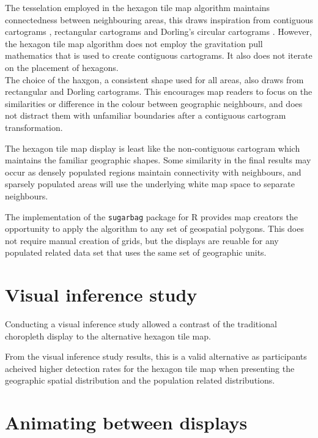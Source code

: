 \documentclass{monashthesis}
\begin{document}
The tesselation employed in the hexagon tile map algorithm maintains connectedness between neighbouring areas, this draws inspiration from contiguous cartograms \autocite{ACA}, rectangular cartograms \autocite{RSCW} and Dorling's circular cartograms \autocite{ACTUC}. However, the hexagon tile map algorithm does not employ the gravitation pull mathematics that is used to create contiguous cartograms. It also does not iterate on the placement of hexagons.\\
The choice of the haxgon, a consistent shape used for all areas, also draws from rectangular and Dorling cartograms. This encourages map readers to focus on the similarities or difference in the colour between geographic neighbours, and does not distract them with unfamiliar boundaries after a contiguous cartogram transformation.

The hexagon tile map display is least like the non-contiguous cartogram \autocite{NAC} which maintains the familiar geographic shapes. Some similarity in the final results may occur as densely populated regions maintain connectivity with neighbours, and sparsely populated areas will use the underlying white map space to separate neighbours.

The implementation of the \texttt{sugarbag} \autocite{sugarbag} package for R \autocite{R} provides map creators the opportunity to apply the algorithm to any set of geospatial polygons. This does not require manual creation of grids, but the displays are reuable for any populated related data set that uses the same set of geographic units.

\hypertarget{visual-inference-study}{%
\section{Visual inference study}\label{visual-inference-study}}

Conducting a visual inference study allowed a contrast of the traditional choropleth display to the alternative hexagon tile map.

From the visual inference study results, this is a valid alternative as participants acheived higher detection rates for the hexagon tile map when presenting the geographic spatial distribution and the population related distributions.

\hypertarget{animating-between-displays}{%
\section{Animating between displays}\label{animating-between-displays}}
\end{document}
